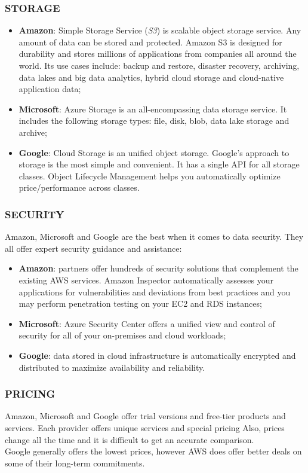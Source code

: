 \documentclass[11pt]{article} %
\begin{document}
\subsubsection{STORAGE}
\begin{itemize}
\item \textbf{Amazon}: Simple Storage Service (\emph{S3}) is scalable object storage service. Any amount of data can be stored and protected. Amazon S3 is designed for durability and stores millions of applications from companies all around the world. Its use cases include: backup and restore, disaster recovery, archiving, data lakes and big data analytics, hybrid cloud storage and cloud-native application data;
\item \textbf{Microsoft}: Azure Storage is an all-encompassing data storage service. It includes the following storage types: file, disk, blob, data lake storage and archive; 
\item \textbf{Google}: Cloud Storage is an unified object storage. Google's approach to storage is the most simple and convenient.  It has a single API for all storage classes. Object Lifecycle Management helps you automatically optimize price/performance across classes.
\end{itemize}

\subsubsection{SECURITY}
Amazon, Microsoft and Google are the best when it comes to data security. They all offer expert security guidance and assistance:
\begin{itemize}
\item \textbf{Amazon}: partners offer hundreds of security solutions that complement the existing AWS services. Amazon Inspector automatically assesses your applications for vulnerabilities and deviations from best practices and you may perform penetration testing on your EC2 and RDS instances;
\item \textbf{Microsoft}: Azure Security Center offers a unified view and control of security for all of your on-premises and cloud workloads; 
\item \textbf{Google}: data stored in cloud infrastructure is automatically encrypted and distributed to maximize availability and reliability.
\end{itemize}

\subsubsection{PRICING}
Amazon, Microsoft and Google offer trial versions and free-tier products and services. Each provider offers unique services and special pricing  Also, prices change all the time and it is difficult to get an accurate comparison. \\
Google generally offers the lowest prices, however AWS does offer better deals on some of their long-term commitments. 
\end{document}
